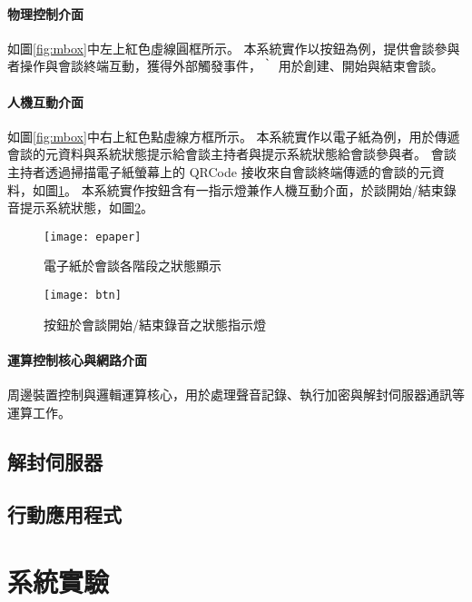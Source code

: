 \paragraph{物理控制介面}

    如圖\ref{fig:mbox}中左上紅色虛線圓框所示。
本系統實作以按鈕為例，提供會談參與者操作與會談終端互動，獲得外部觸發事件，｀
用於創建、開始與結束會談。

\paragraph{人機互動介面}

    如圖\ref{fig:mbox}中右上紅色點虛線方框所示。
本系統實作以電子紙為例，用於傳遞會談的元資料與系統狀態提示給會談主持者與提示系統狀態給會談參與者。
會談主持者透過掃描電子紙螢幕上的 QRCode 接收來自會談終端傳遞的會談的元資料，如圖\ref{fig:epaper}。
本系統實作按鈕含有一指示燈兼作人機互動介面，於談開始/結束錄音提示系統狀態，如圖\ref{fig:btn}。

\begin{figure}[H]
    \centering
    \texttt{[image: epaper]}
    \caption{電子紙於會談各階段之狀態顯示}\label{fig:epaper}
\end{figure}

\begin{figure}[H]
    \centering
    \texttt{[image: btn]}
    \caption{按鈕於會談開始/結束錄音之狀態指示燈}\label{fig:btn}
\end{figure}

\paragraph{運算控制核心與網路介面}

    周邊裝置控制與邏輯運算核心，用於處理聲音記錄、執行加密與解封伺服器通訊等運算工作。



\subsection{解封伺服器}


\subsection{行動應用程式}


\section{系統實驗}

